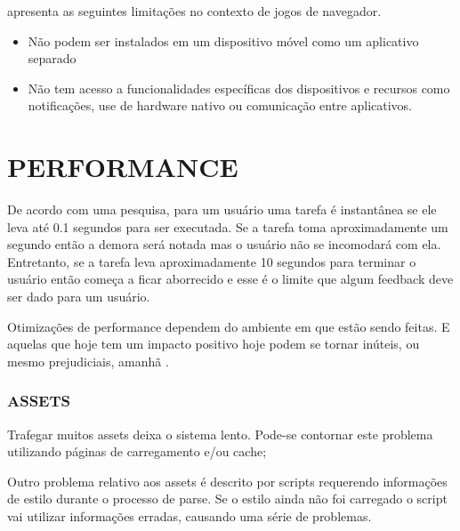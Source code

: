 \begin{draft}
\cite{browserGamesTechnologyAndFuture} apresenta as seguintes limitações
no contexto de jogos de navegador.

\begin{itemize}
\item Não podem ser instalados em um dispositivo móvel como um aplicativo separado
\item Não tem acesso a funcionalidades específicas dos dispositivos e recursos como notificações, use de hardware nativo ou comunicação entre aplicativos.
\end{itemize}

\section{PERFORMANCE}

De acordo com uma pesquisa, para um usuário uma tarefa é instantânea
se ele leva até 0.1 segundos para ser executada. Se a tarefa toma
aproximadamente um segundo então a demora será notada mas o
usuário não se incomodará com ela. Entretanto, se a tarefa leva
aproximadamente 10 segundos para terminar o usuário então começa a
ficar aborrecido e esse é o limite que algum feedback deve ser dado
para um usuário.

Otimizações de performance dependem do ambiente em que estão
sendo feitas. E aquelas que hoje tem um impacto positivo hoje
podem se tornar inúteis, ou mesmo prejudiciais, amanhã
\autocite[pp.131]{html5mostwanted}.

\subsubsection{ASSETS}

Trafegar muitos assets deixa o sistema lento. Pode-se contornar este
problema utilizando páginas de carregamento e/ou cache;

Outro problema relativo aos assets é descrito por \cite{howBrowsersWork}
scripts requerendo informações de estilo durante o processo de
parse. Se o estilo ainda não foi carregado o script vai utilizar
informações erradas, causando uma série de problemas.

\end{draft}
